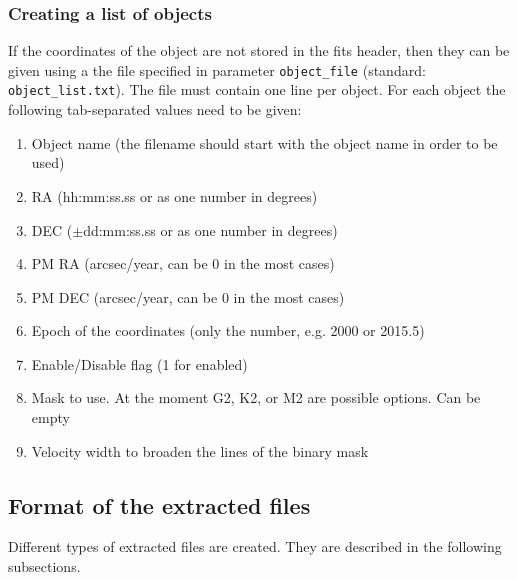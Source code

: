 \documentclass[10pt,a4paper]{article}
\begin{document}

\subsubsection{Creating a list of objects}
\label{Section:create_object_list_file}
If the coordinates of the object are not stored in the fits header, then they can be given using a the file specified in parameter \verb|object_file| (standard: \verb|object_list.txt|). The file must contain one line per object. For each object the following tab-separated values need to be given:
\begin{enumerate}\setlength\itemsep{0em}
 \item Object name (the filename should start with the object name in order to be used)
 \item RA (hh:mm:ss.ss or as one number in degrees)
 \item DEC ($\pm$dd:mm:ss.ss or as one number in degrees)
 \item PM RA (arcsec/year, can be 0 in the most cases)
 \item PM DEC (arcsec/year, can be 0 in the most cases)
 \item Epoch of the coordinates (only the number, e.g. 2000 or 2015.5)
 \item Enable/Disable flag (1 for enabled)
 \item Mask to use. At the moment G2, K2, or M2 are possible options. Can be empty
 \item Velocity width to broaden the lines of the binary mask
\end{enumerate}


\subsection{Format of the extracted files}
Different types of extracted files are created. They are described in the following subsections.
\end{document}

